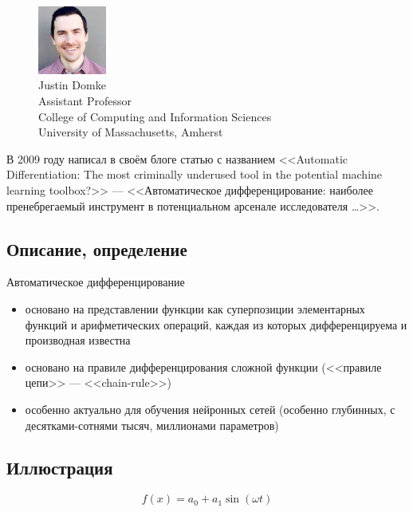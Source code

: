 \documentclass{beamer}
\begin{document}
\begin{frame}{\secname}{\subsecname}
  \begin{figure}
	\includegraphics[width=0.2\textwidth,left]{domke-headshot}
	\caption{
	  Justin Domke \\
	  Assistant Professor \\
	  College of Computing and Information Sciences \\
	  University of Massachusetts, Amherst
	}
  \end{figure} \pause
	В 2009 году написал в своём блоге статью с названием \pause <<Automatic
	Differentiation: The most criminally underused tool in the potential machine
	learning toolbox?>>
  --- <<Автоматическое дифференцирование: наиболее пренебрегаемый
  инструмент в потенциальном арсенале исследователя \ldots>>.
\end{frame}


\subsection{Описание, определение}

\begin{frame}{\secname}{\subsecname}
  Автоматическое дифференцирование \pause
  \begin{itemize}
	\item основано на представлении функции как суперпозиции элементарных
	  функций и арифметических операций, каждая из которых дифференцируема и
	  производная известна \pause
	\item основано на правиле дифференцирования сложной функции (<<правиле
	  цепи>> --- <<chain-rule>>) \pause
	\item особенно актуально для обучения нейронных сетей (особенно глубинных, с
		десятками-сотнями тысяч, миллионами параметров)
  \end{itemize}
\end{frame}


\subsection{Иллюстрация}

\begin{frame}{\secname}{\subsecname}
	\[
		f(x) = a_0 + a_1 \sin (\omega t)
	\]
\end{frame}
\end{document}
